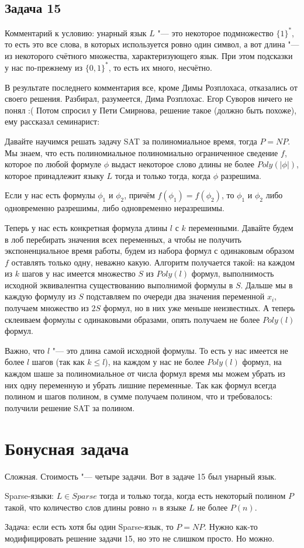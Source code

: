 \subsection{Задача 15}
	Комментарий к условию: унарный язык $L$ "--- это некоторое подмножество $\{1\}^*$,
	то есть это все слова, в которых используется ровно один символ, а вот длина "--- из некоторого
	счётного множества, характеризующего язык.
	При этом подсказки у нас по-прежнему из $\{0,1\}^*$, то есть их много, несчётно.

	В результате последнего комментария все, кроме Димы Розплохаса, отказались от своего решения.
	Разбирал, разумеется, Дима Розплохас.
	Егор Суворов ничего не понял :(
	Потом спросил у Пети Смирнова, решение такое (должно быть похоже), ему рассказал семинарист:

	Давайте научимся решать задачу SAT за полиномиальное время, тогда $P=NP$.
	Мы знаем, что есть полиномиальное полиномиально ограниченное сведение $f$,
	которое по любой формуле $\phi$ выдаст некоторое слово длины не более $Poly(|\phi|)$,
	которое принадлежит языку $L$ тогда и только тогда, когда $\phi$ разрешима.
	\begin{assertion}
		Если у нас есть формулы $\phi_1$ и $\phi_2$, причём $f(\phi_1) = f(\phi_2)$,
		то $\phi_1$ и $\phi_2$ либо одновременно разрешимы, либо одновременно неразрешимы.
	\end{assertion}
	Теперь у нас есть конкретная формула длины $l$ с $k$ переменными.
	Давайте будем в лоб перебирать значения всех переменных, а чтобы не получить экспоненциальное
	время работы, будем из набора формул с одинаковым образом $f$ оставлять только одну, неважно какую.
	Алгоритм получается такой: на каждом из $k$ шагов у нас имеется множество $S$ из $Poly(l)$
	формул, выполнимость исходной эквивалентна существованию выполнимой формулы в $S$.
	Дальше мы в каждую формулу из $S$ подставляем по очереди два значения переменной $x_i$,
	получаем множество из $2S$ формул, но в них уже меньше неизвестных.
	А теперь склеиваем формулы с одинаковыми образами, опять получаем не более $Poly(l)$ формул.

	Важно, что $l$ "--- это длина самой исходной формулы.
	То есть у нас имеется не более $l$ шагов (так как $k \le l$), на каждом у нас не более
	$Poly(l)$ формул, на каждом шаше за полиномиальное от числа формул время мы можем убрать из
	них одну переменную и убрать лишние переменные.
	Так как формул всегда полином и шагов полином, в сумме получаем полином, что и требовалось:
	получили решение SAT за полином.

\section{Бонусная задача}
	Сложная. Стоимость "--- четыре задачи.
	Вот в задаче 15 был унарный язык.
	\begin{Def}
		Sparse-языки: $L \in Sparse$ тогда и только тогда, когда есть некоторый
		полином $P$ такой, что количество слов длины ровно $n$ в языке $L$ не более
		$P(n)$.
	\end{Def}
	Задача: если есть хотя бы один Sparse-язык, то $P=NP$.
	Нужно как-то модифицировать решение задачи 15, но это не слишком просто.
	Но можно.
